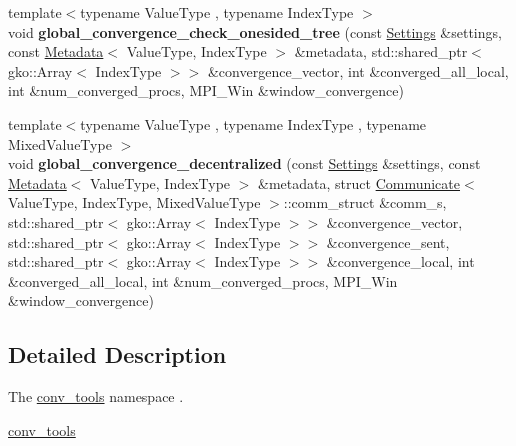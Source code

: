 \begin{DoxyCompactItemize}
{\footnotesize template$<$typename Value\+Type , typename Index\+Type $>$ }\\void {\bfseries global\+\_\+convergence\+\_\+check\+\_\+onesided\+\_\+tree} (const \hyperlink{structschwz_1_1Settings}{Settings} \&settings, const \hyperlink{structschwz_1_1Metadata}{Metadata}$<$ Value\+Type, Index\+Type $>$ \&metadata, std\+::shared\+\_\+ptr$<$ gko\+::\+Array$<$ Index\+Type $>$$>$ \&convergence\+\_\+vector, int \&converged\+\_\+all\+\_\+local, int \&num\+\_\+converged\+\_\+procs, M\+P\+I\+\_\+\+Win \&window\+\_\+convergence)
\item 
\mbox{\label{namespaceschwz_1_1conv__tools_afd855921e751ec9b0274cdb657372baa}} 
{\footnotesize template$<$typename Value\+Type , typename Index\+Type , typename Mixed\+Value\+Type $>$ }\\void {\bfseries global\+\_\+convergence\+\_\+decentralized} (const \hyperlink{structschwz_1_1Settings}{Settings} \&settings, const \hyperlink{structschwz_1_1Metadata}{Metadata}$<$ Value\+Type, Index\+Type $>$ \&metadata, struct \hyperlink{classschwz_1_1Communicate}{Communicate}$<$ Value\+Type, Index\+Type, Mixed\+Value\+Type $>$\+::comm\+\_\+struct \&comm\+\_\+s, std\+::shared\+\_\+ptr$<$ gko\+::\+Array$<$ Index\+Type $>$$>$ \&convergence\+\_\+vector, std\+::shared\+\_\+ptr$<$ gko\+::\+Array$<$ Index\+Type $>$$>$ \&convergence\+\_\+sent, std\+::shared\+\_\+ptr$<$ gko\+::\+Array$<$ Index\+Type $>$$>$ \&convergence\+\_\+local, int \&converged\+\_\+all\+\_\+local, int \&num\+\_\+converged\+\_\+procs, M\+P\+I\+\_\+\+Win \&window\+\_\+convergence)
\end{DoxyCompactItemize}


\subsection{Detailed Description}
The \hyperlink{namespaceschwz_1_1conv__tools}{conv\+\_\+tools} namespace . 

\hyperlink{namespaceschwz_1_1conv__tools}{conv\+\_\+tools} 